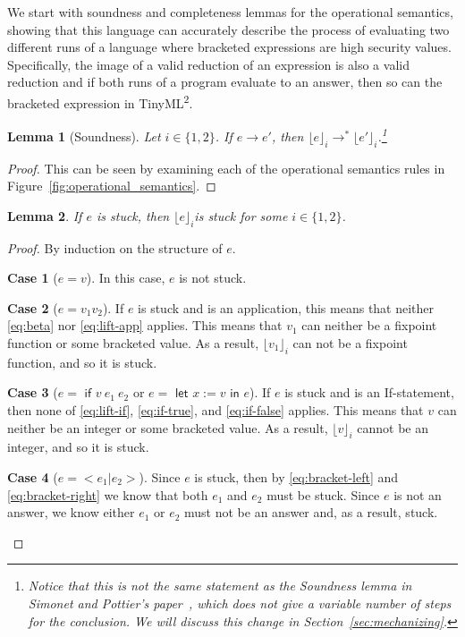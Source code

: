 \documentclass[a4paper,twocolumn]{article}
\newcommand{\langName}[0]{TinyML\textsuperscript{2}}
\newcommand{\lift}[1]{\lfloor #1 \rfloor}
\theoremstyle{plain}
\newtheorem{lemma}{Lemma}
\theoremstyle{definition}
\newtheorem*{case}{Case}
\begin{document}
We start with soundness and completeness lemmas for the operational semantics,
showing that this language can accurately describe the process of evaluating two
different runs of a language where bracketed expressions are high security
values.  Specifically, the image of a valid reduction of an expression is also a
valid reduction and if both runs of a program evaluate to an answer, then so can
the bracketed expression in \langName.

\begin{lemma}[Soundness]
  \label{lem:soundness}
  Let $i \in \{1, 2\}$. If $e \to e'$, then $\lift{e}_i \to^*
  \lift{e'}_i$.\footnote{Notice that this is not the same statement as the
  Soundness lemma in Simonet and Pottier's paper~\cite{InfoFlowML}, which does
  not give a variable number of steps for the conclusion.  We will discuss this
  change in Section~\ref{sec:mechanizing}.}
\end{lemma}
\begin{proof}
  This can be seen by examining each of the operational semantics rules in
  Figure~\ref{fig:operational_semantics}.
\end{proof}

\begin{lemma}
  \label{lem:stuck_bracket}
  If $e$ is stuck, then $\lift{e}_i$is stuck for some $i \in \{1, 2\}$.
\end{lemma}
\begin{proof}
  By induction on the structure of $e$.

  \begin{case}[$e = v$]
    In this case, $e$ is not stuck.
  \end{case}

  \begin{case}[$e = v_1 v_2$]
    If $e$ is stuck and is an application, this means that neither
    \ref{eq:beta} nor \ref{eq:lift-app} applies.  This means that $v_1$ can
    neither be a fixpoint function or some bracketed value.  As a result,
    $\lift{v_1}_i$ can not be a fixpoint function, and so it is stuck.
  \end{case}

  \begin{case}[$e = \textsf{ if } v \: e_1 \: e_2$ or $e =
    \textsf{ let } x := v \textsf{ in } e$]
    If $e$ is stuck and is an If-statement, then none of \ref{eq:lift-if}, \ref{eq:if-true}, and \ref{eq:if-false} applies. This means that $v$ can neither
    be an integer or some bracketed value.  As a result, $\lift{v}_i$ cannot
    be an integer, and so it is stuck.
  \end{case}

  \begin{case}[$e = < e_1 | e_2 >$]
    Since $e$ is stuck, then by \ref{eq:bracket-left} and \ref{eq:bracket-right}
    we know that both $e_1$ and $e_2$ must be stuck.  Since $e$ is not an
    answer, we know either $e_1$ or $e_2$ must not be an answer and, as a
    result, stuck.
  \end{case}
\end{proof}
\end{document}
